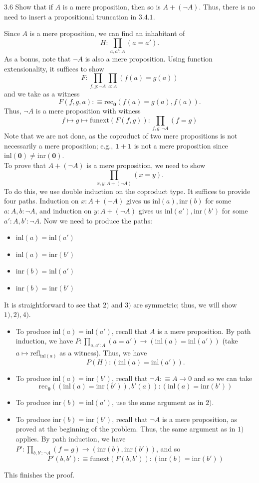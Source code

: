 \documentclass[14pt]{extarticle}
\newcommand{\0}{{\mathbf 0}}
\newcommand{\1}{{\mathbf 1}}
\newcommand{\2}{{\mathbf 2}}
\newcommand{\mt}{\mapsto}
\newcommand{\rec}{\mathrm{rec}}
\newcommand{\refl}{\mathrm{refl}}
\newcommand{\inl}{\mathrm{inl}}
\newcommand{\inr}{\mathrm{inr}}
\newcommand{\funext}{\mathrm{funext}}
\begin{document}
\begin{prob}{3.6}{}
Show that if $A$ is a mere proposition, then so is $A + (\neg A)$. Thus, there is no need to insert a propositional truncation in $3.4.1$.
\end{prob}
Since $A$ is a mere proposition, we can find an inhabitant of
\[H : \prod_{a,a':A}(a = a').\] As a bonus, note that $\neg A$ is also a mere proposition. Using function extensionality, it suffices to show
\[F : \prod_{f,g: \neg A}\prod_{a:A} (f(a) = g(a))\] and we take as a witness
\[F(f,g,a) :\equiv \rec_\0(f(a) = g(a),f(a)).\] Thus, $\neg A$ is a mere proposition with witness
\[f \mt g \mt \funext(F(f,g)) : \prod_{f,g:\neg A}(f = g)\]
Note that we are not done, as the coproduct of two mere propositions is not necessarily a mere proposition; e.g., $\1 + \1$ is not a mere proposition since $\inl(\0) \neq \inr(\0)$.\\
To prove that $A + (\neg A)$ is a mere proposition, we need to show
\[\prod_{x,y : A + (\neg A)}(x=y).\] To do this, we use double induction on the coproduct type. It suffices to provide four paths. Induction on $x: A + (\neg A)$ gives us $\inl(a),\inr(b)$ for some $a:A, b: \neg A$, and induction on $y: A + (\neg A)$ gives us $\inl(a'),\inr(b')$ for some $a':A, b': \neg A$. Now we need to produce the paths:
\begin{itemize}
\item [1)] $\inl(a) = \inl(a')$
\item [2)] $\inl(a) = \inr(b')$
\item [3)] $\inr(b) = \inl(a')$
\item [4)] $\inr(b) = \inr(b')$
\end{itemize}
It is straightforward to see that $2)$ and $3)$ are symmetric; thus, we will show $1),2),4)$.

\begin{itemize}
\item [1)] To produce $\inl(a) = \inl(a')$, recall that $A$ is a mere proposition. By path induction, we have $P : \prod_{a,a':A}(a = a') \to (\inl(a) = \inl(a'))$ (take $a \mt \refl_{\inl(a)}$ as a witness). Thus, we have \[P(H) : (\inl(a) = \inl(a')).\]

\item [2)] To produce $\inl(a) = \inr(b')$, recall that $\neg A :\equiv A \to 0$ and so we can take 
\[\rec_\0((\inl(a) = \inr(b')), b'(a)) : (\inl(a) = \inr(b'))\]
\item [3)] To produce $\inr(b) = \inl(a')$, use the same argument as in $2)$.
\item [4)] To produce $\inr(b) = \inr(b')$, recall that $\neg A$ is a mere proposition, as proved at the beginning of the problem. Thus, the same argument as in $1)$ applies. By path induction, we have $P' : \prod_{b,b' : \neg A}(f = g) \to (\inr(b), \inr(b'))$, and so
\[P'(b,b') :\equiv \funext(F(b,b')) : (\inr(b) = \inr(b'))\]
\end{itemize}
This finishes the proof.
\end{document}
